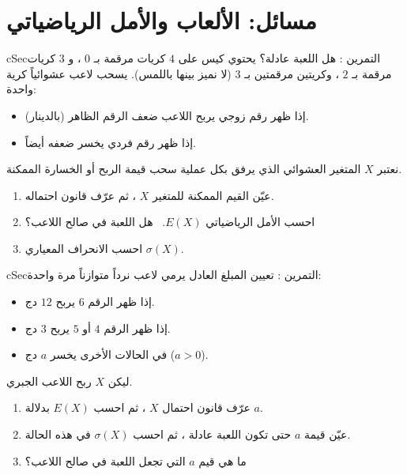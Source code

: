 \documentclass[12pt,a4paper]{article}
\newenvironment{BOX}[2]{\begin{otherlanguage}{english}\begin{arbox}{#1}{#2}}{\end{arbox}\end{otherlanguage}}
\newcounter{exo}
\newenvironment{tamrin}[1]{\stepcounter{exo}\begin{BOX}{cSec}{التمرين \theexo: #1}}{\end{BOX}}
\begin{document}
\section{مسائل: الألعاب والأمل الرياضياتي}
\begin{tamrin}{هل اللعبة عادلة؟}
يحتوي كيس على $4$ كريات مرقمة بـ $0$ ، و $3$ كريات مرقمة بـ $2$ ، وكريتين مرقمتين بـ $3$ (لا نميز بينها باللمس). يسحب لاعب عشوائياً كرية واحدة:
\begin{itemize}
\item إذا ظهر رقم زوجي يربح اللاعب ضعف الرقم الظاهر (بالدينار).
\item إذا ظهر رقم فردي يخسر ضعفه أيضاً.
\end{itemize}
نعتبر $X$ المتغير العشوائي الذي يرفق بكل عملية سحب قيمة الربح أو الخسارة الممكنة.
\begin{enumerate}
\item عيّن القيم الممكنة للمتغير $X$ ، ثم عرّف قانون احتماله.
\item احسب الأمل الرياضياتي $E(X)$. \ هل اللعبة في صالح اللاعب؟
\item احسب الانحراف المعياري $\sigma(X)$.
\end{enumerate}
\end{tamrin}

\begin{tamrin}{تعيين المبلغ العادل}
يرمي لاعب نرداً متوازناً مرة واحدة:
\begin{itemize}
\item إذا ظهر الرقم $6$ يربح $12$ دج.
\item إذا ظهر الرقم $4$ أو $5$ يربح $3$ دج.
\item في الحالات الأخرى يخسر $a$ دج ($a>0$).
\end{itemize}
ليكن $X$ ربح اللاعب الجبري.
\begin{enumerate}
\item عرّف قانون احتمال $X$ ، ثم احسب $E(X)$ بدلالة $a$.
\item عيّن قيمة $a$ حتى تكون اللعبة عادلة ، ثم احسب $\sigma(X)$ في هذه الحالة.
\item ما هي قيم $a$ التي تجعل اللعبة في صالح اللاعب؟
\end{enumerate}
\end{tamrin}
\end{document}
